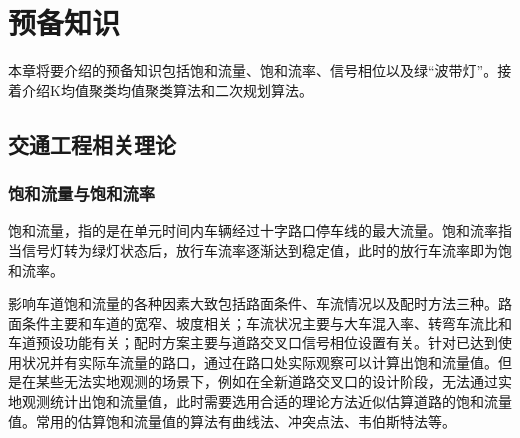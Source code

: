 \chapter{预备知识}
本章将要介绍的预备知识包括饱和流量、饱和流率、信号相位以及绿“波带灯”。接着介绍K均值聚类均值聚类算法和二次规划算法。
\section{交通工程相关理论}

\subsection{饱和流量与饱和流率}
饱和流量，指的是在单元时间内车辆经过十字路口停车线的最大流量\cite{wuzhen2008}。饱和流率指当信号灯转为绿灯状态后，放行车流率逐渐达到稳定值，此时的放行车流率即为饱和流率\cite{liuyi2010}。





影响车道饱和流量的各种因素大致包括路面条件、车流情况以及配时方法三种。路面条件主要和车道的宽窄、坡度相关；车流状况主要与大车混入率、转弯车流比和车道预设功能有关\cite{wuzhen2009}；配时方案主要与道路交叉口信号相位设置有关\cite{likeping2007}。针对已达到使用状况并有实际车流量的路口，通过在路口处实际观察可以计算出饱和流量值。但是在某些无法实地观测的场景下，例如在全新道路交叉口的设计阶段，无法通过实地观测统计出饱和流量值，此时需要选用合适的理论方法近似估算道路的饱和流量值\cite{shaochangqiao2011}。常用的估算饱和流量值的算法有曲线法\cite{1988Using}、冲突点法\cite{xuliqun2001}、韦伯斯特法\cite{wangjiawen2021}等。

